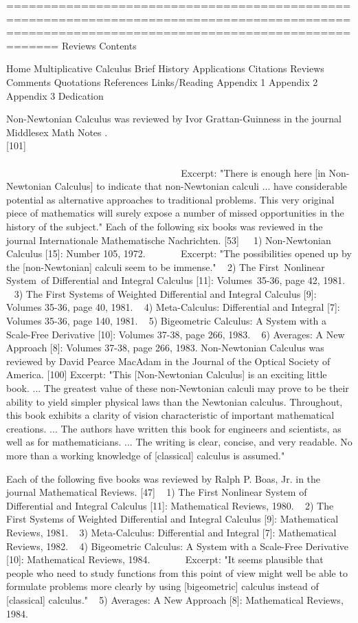 \documentclass[12pt]{article}
\begin{document}
=================================================================================================================================================
Reviews
Contents

Home
Multiplicative Calculus
Brief History
Applications
Citations
Reviews
Comments
Quotations
References
Links/Reading
Appendix 1
Appendix 2
Appendix 3
Dedication



Non-Newtonian Calculus was reviewed by Ivor Grattan-Guinness in the journal Middlesex Math Notes . [101]                                                                                                                                                                                Excerpt: "There is enough here [in Non-Newtonian Calculus] to indicate that non-Newtonian calculi ... have considerable potential as alternative approaches to traditional problems. This very original piece of mathematics will surely expose a number of missed opportunities in the history of the subject."
Each of the following six books was reviewed in the journal Internationale Mathematische Nachrichten. [53]    1) Non-Newtonian Calculus [15]: Number 105, 1972.        Excerpt: "The possibilities opened up by the [non-Newtonian] calculi seem to be immense."   2) The First Nonlinear System of Differential and Integral Calculus [11]: Volumes 35-36, page 42, 1981.   3) The First Systems of Weighted Differential and Integral Calculus [9]: Volumes 35-36, page 40, 1981.   4) Meta-Calculus: Differential and Integral [7]: Volumes 35-36, page 140, 1981.   5) Bigeometric Calculus: A System with a Scale-Free Derivative [10]: Volumes 37-38, page 266, 1983.   6) Averages: A New Approach [8]: Volumes 37-38, page 266, 1983.
Non-Newtonian Calculus was reviewed by David Pearce MacAdam in the Journal of the Optical Society of America. [100] 
Excerpt: "This [Non-Newtonian Calculus] is an exciting little book. ... The greatest value of these non-Newtonian calculi may prove to be their ability to yield simpler physical laws than the Newtonian calculus. Throughout, this book exhibits a clarity of vision characteristic of important mathematical creations. ... The authors have written this book for engineers and scientists, as well as for mathematicians. ... The writing is clear, concise, and very readable. No more than a working knowledge of [classical] calculus is assumed."

Each of the following five books was reviewed by Ralph P. Boas, Jr. in the journal Mathematical Reviews. [47] 
  1) The First Nonlinear System of Differential and Integral Calculus [11]: Mathematical Reviews, 1980.
  2) The First Systems of Weighted Differential and Integral Calculus [9]: Mathematical Reviews, 1981.
  3) Meta-Calculus: Differential and Integral [7]: Mathematical Reviews, 1982.
  4) Bigeometric Calculus: A System with a Scale-Free Derivative [10]: Mathematical Reviews, 1984.
       Excerpt: "It seems plausible that people who need to study functions from this point of view might well be able to formulate problems more clearly by using [bigeometric] calculus instead of [classical] calculus."
  5) Averages: A New Approach [8]: Mathematical Reviews, 1984.
\end{document}
